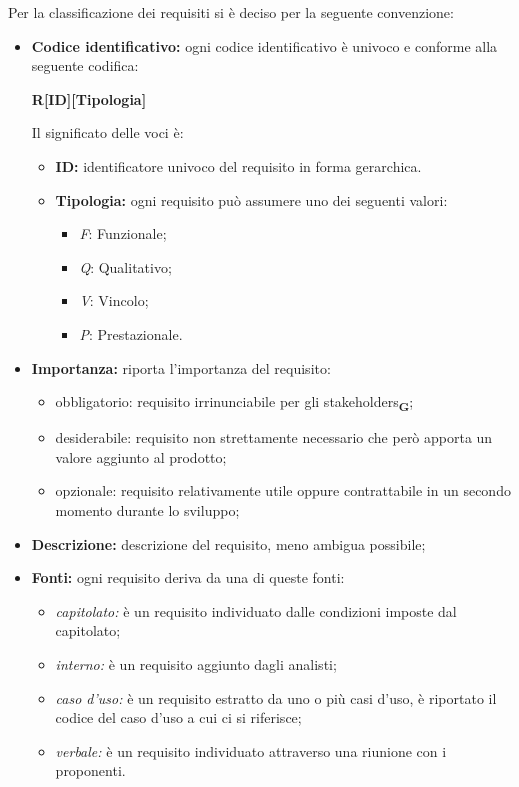Per la classificazione dei requisiti si è deciso per la seguente convenzione:
\begin{itemize}
    \item \textbf{Codice identificativo:} ogni codice identificativo è univoco e conforme alla seguente codifica:
          \begin{center}
              \textbf{R[ID][Tipologia]}
          \end{center}
          Il significato delle voci è:
          \begin{itemize}
              \item \textbf{ID:} identificatore univoco del requisito in forma gerarchica.
              \item \textbf{Tipologia:} ogni requisito può assumere uno dei seguenti valori:
                    \begin{itemize}
                        \item \textit{F}: Funzionale;
                        \item \textit{Q}: Qualitativo;
                        \item \textit{V}: Vincolo;
                        \item \textit{P}: Prestazionale.
                    \end{itemize}
          \end{itemize}

    \item \textbf{Importanza:} riporta l'importanza del requisito:
          \begin{itemize}
              \item obbligatorio: requisito irrinunciabile per gli stakeholders\textsubscript{\textbf{G}};
              \item desiderabile: requisito non strettamente necessario che però apporta un valore aggiunto al prodotto;
              \item opzionale: requisito relativamente utile oppure contrattabile in un secondo momento durante lo sviluppo;
          \end{itemize}
    \item \textbf{Descrizione:} descrizione del requisito, meno ambigua possibile;
    \item \textbf{Fonti:} ogni requisito deriva da una di queste fonti:
          \begin{itemize}
              \item \textit{capitolato:} è un requisito individuato dalle condizioni imposte dal capitolato;
              \item \textit{interno:} è un requisito aggiunto dagli analisti;
              \item \textit{caso d'uso:} è un requisito estratto da uno o più casi d'uso, è riportato il codice del caso d'uso a cui ci si riferisce;
              \item \textit{verbale:} è un requisito individuato attraverso una riunione con i proponenti.
          \end{itemize}
\end{itemize}

